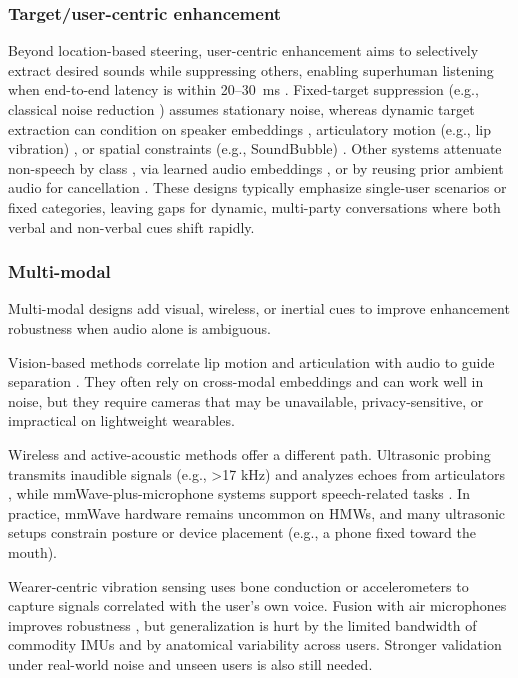 \subsubsection{Target/user-centric enhancement}
Beyond location-based steering, user-centric enhancement aims to selectively extract desired sounds while suppressing others, enabling superhuman listening when end-to-end latency is within \mbox{20–30 ms} \cite{stone1999tolerable, gupta2020acoustic}. Fixed-target suppression (e.g., classical noise reduction \cite{wiener1949extrapolation}) assumes stationary noise, whereas dynamic target extraction can condition on speaker embeddings \cite{zmolikova2023neural, veluri2024look}, articulatory motion (e.g., lip vibration) \cite{liu2021wavoice}, or spatial constraints (e.g., SoundBubble) \cite{chen2024hearable}. Other systems attenuate non-speech by class \cite{veluri2023semantic}, via learned audio embeddings \cite{liu22w_interspeech}, or by reusing prior ambient audio for cancellation \cite{shen2018mute}. These designs typically emphasize single-user scenarios or fixed categories, leaving gaps for dynamic, multi-party conversations where both verbal and non-verbal cues shift rapidly.

\subsubsection{Multi-modal}
Multi-modal designs add visual, wireless, or inertial cues to improve enhancement robustness when audio alone is ambiguous.

Vision-based methods correlate lip motion and articulation with audio to guide separation \cite{michelsanti2021overview, gao2021visualvoice}. They often rely on cross-modal embeddings and can work well in noise, but they require cameras that may be unavailable, privacy-sensitive, or impractical on lightweight wearables.

Wireless and active-acoustic methods offer a different path. Ultrasonic probing transmits inaudible signals (e.g., >17 kHz) and analyzes echoes from articulators \cite{sun2021ultrase, zhang2021sensing}, while mmWave-plus-microphone systems support speech-related tasks \cite{liu2021wavoice, ozturk2021radiomic}. In practice, mmWave hardware remains uncommon on HMWs, and many ultrasonic setups constrain posture or device placement (e.g., a phone fixed toward the mouth).

Wearer-centric vibration sensing uses bone conduction or accelerometers to capture signals correlated with the user's own voice. Fusion with air microphones improves robustness \cite{wang2022fusing, tagliasacchi2020seanet}, but generalization is hurt by the limited bandwidth of commodity IMUs \cite{Inertial63:online} and by anatomical variability across users. Stronger validation under real-world noise and unseen users is also still needed.

